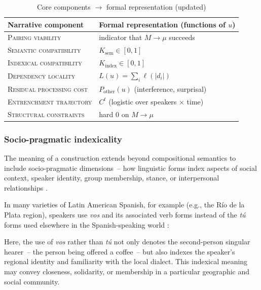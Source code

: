 \documentclass[12pt,letterpaper]{article}
\begin{document}
\begin{table}[h]
\centering
\caption{Core components $\rightarrow$ formal representation (updated)}
\label{tab:vars2}
\begin{tabular}{@{}ll@{}}
\toprule
Narrative component & Formal representation (functions of \(u\))\\
\midrule
\textsc{Pairing viability}        & indicator that \(M\!\to\!\mu\) succeeds\\
\textsc{Semantic compatibility}   & \(K_{\text{sem}}\in[0,1]\)\\
\textsc{Indexical compatibility}  & \(K_{\text{index}}\in[0,1]\)\\
\textsc{Dependency locality}      & \(L(u)=\sum_i\ell(|d_i|)\)\\
\textsc{Residual processing cost} & \(P_{\text{other}}(u)\) (interference, surprisal)\\
\textsc{Entrenchment trajectory}  & \(C^{t}\) (logistic over speakers \(\times\) time)\\
\textsc{Structural constraints}   & hard \(0\) on \(M\!\to\!\mu\)\\
\bottomrule
\end{tabular}
\end{table}

\subsubsection{Socio-pragmatic indexicality}\label{sec:socio-indexical}

The meaning of a construction extends beyond compositional semantics to include socio-pragmatic dimensions~-- how linguistic forms index aspects of social context, speaker identity, group membership, stance, or interpersonal relationships \autocite{Eckert2012, Silverstein1976}.

In many varieties of Latin American Spanish, for example (e.g., the Río de la Plata region), speakers use \textit{vos} and its associated verb forms instead of the \textit{tú} forms used elsewhere in the Spanish-speaking world \autocite{bertolotti2016}:

\z

Here, the use of \textit{vos} rather than \textit{tú} not only denotes the second-person singular hearer~-- the person being offered a coffee~-- but also indexes the speaker's regional identity and familiarity with the local dialect. This indexical meaning may convey closeness, solidarity, or membership in a particular geographic and social community.
\end{document}
